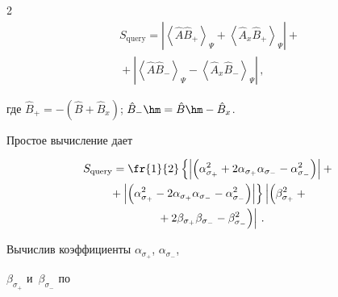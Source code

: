 \begin{multicols}{2}
    \begin{multline*}


    S_{\mathrm{query}}=\left\vert \left \langle \hat{A}\hat{B}_+\right\rangle_\Psi 


+\left\langle \hat{A}_x\hat{B}_+\right\rangle_\Psi\right\vert +{}\\


{}+


    \left\vert \left\langle \hat{A}\hat{B}_-\right\rangle_\Psi -\left\langle 


\hat{A}_x\hat{B}_-\right\rangle_\Psi\right\vert\,,




    \end{multline*}


где $\hat{B}_+= -(\hat{B}+\hat{B}_x)$; $\hat{B}_-\hm= \hat{B}\hm- \hat{B}_x$.


    


    Простое вычисление дает


    \begin{multline}


    S_{\mathrm{query}}= \fr{1}{2} \left\{ \left\vert \left( \alpha^2_{\sigma_+} 


+2\alpha_{\sigma_+} \alpha_{\sigma_-}-\alpha^2_{\sigma_-}\right)\right\vert 


+{}\right.\\


    \left.{}+


    \left\vert \left( \alpha^2_{\sigma_+} -2\alpha_{\sigma_+}\alpha_{\sigma_-} - 


\alpha^2_{\sigma_-}\right)\right\vert \right\} 


    \left\vert \left(\beta^2_{\sigma_+} +{}\right.\right.\\


   \left.\left. {}+ 2\beta_{\sigma_+} \beta_{\sigma_-} -


\beta^2_{\sigma_-}\right)\right\vert\,.


    \label{e11-an}


    \end{multline}


                


    


    Вычислив коэффициенты $\alpha_{\sigma_+}$, $\alpha_{\sigma_-}$, 


$\beta_{\sigma_+}$ и~$\beta_{\sigma_-}$ по  



\end{multicols}

